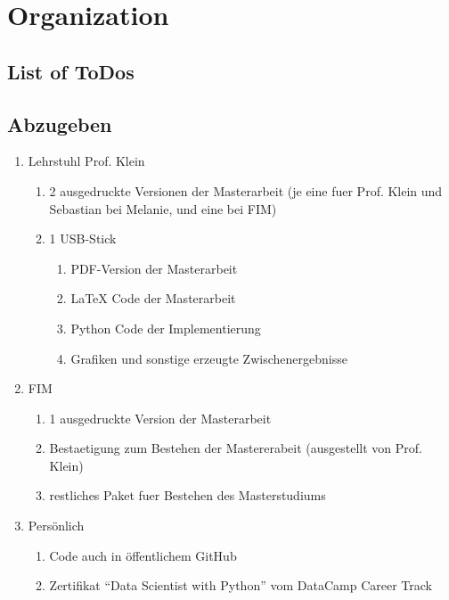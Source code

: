 \chapter{Organization}

\section{List of ToDos}

\listoftodos


\newpage
\section{Abzugeben}
\begin{enumerate}[noitemsep]
	\item Lehrstuhl Prof. Klein
	\begin{enumerate}[noitemsep]
		\item 2 ausgedruckte Versionen der Masterarbeit (je eine fuer Prof. Klein und Sebastian bei Melanie, und eine bei FIM)
		\item 1 USB-Stick
		\begin{enumerate}[noitemsep]
			\item PDF-Version der Masterarbeit
			\item LaTeX Code der Masterarbeit
			\item Python Code der Implementierung
			\item Grafiken und sonstige erzeugte Zwischenergebnisse
		\end{enumerate}
	\end{enumerate}
	\item FIM
	\begin{enumerate}[noitemsep]
		\item 1 ausgedruckte Version der Masterarbeit
		\item Bestaetigung zum Bestehen der Mastererabeit (ausgestellt von Prof. Klein)
		\item restliches Paket fuer Bestehen des Masterstudiums
	\end{enumerate}
	\item Persönlich
	\begin{enumerate}[noitemsep]
		\item Code auch in öffentlichem GitHub
		\item Zertifikat \enquote{Data Scientist with Python} vom DataCamp Career Track 
	\end{enumerate}
\end{enumerate}

